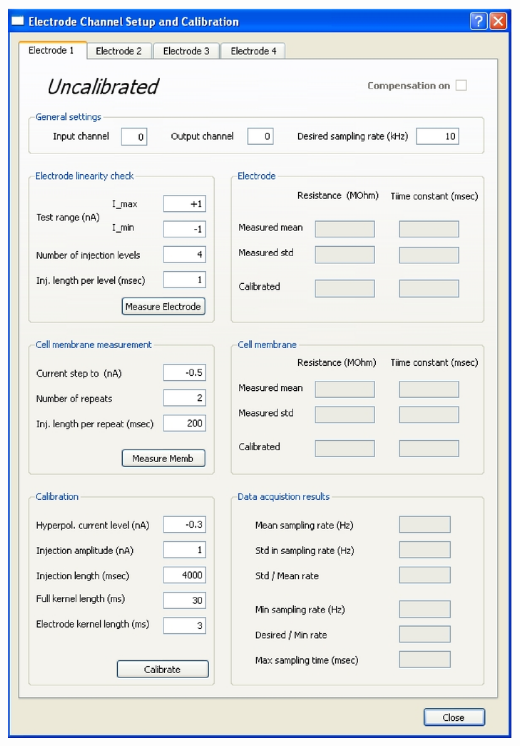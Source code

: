 \documentclass{article}
\begin{document}
\includegraphics[scale=0.6]{elecCalibDialog}
\end{document}
